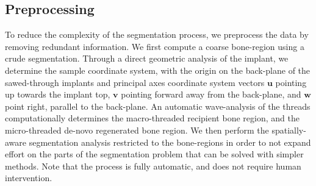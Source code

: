 \documentclass[pdflatex,sn-mathphys]{sn-jnl}%
\theoremstyle{thmstyleone}%
\theoremstyle{thmstyletwo}%
\theoremstyle{thmstylethree}%
\begin{document}
\subsection{Preprocessing}\label{sec:preprocess}
To reduce the complexity of the segmentation process, we preprocess
the data by removing redundant information.
We first compute a coarse bone-region using a crude segmentation. Through a
direct geometric analysis of the implant, we determine the sample coordinate
system, with the origin on the back-plane of the sawed-through implants and
principal axes coordinate system vectors $\mathbf{u}$ pointing up towards the
implant top, $\mathbf{v}$ pointing forward away from the back-plane, and
$\mathbf{w}$ point right, parallel to the back-plane. An automatic
wave-analysis of the threads computationally determines the macro-threaded
recipient bone region, and the micro-threaded de-novo regenerated bone region.
We then perform the spatially-aware segmentation analysis restricted to the
bone-regions in order to not expand effort on the parts of the segmentation
problem that can be solved with simpler methods. Note that the process is fully
automatic, and does not require human intervention.


\end{document}
